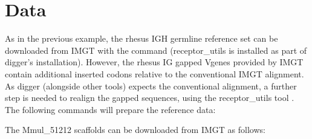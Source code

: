 \documentclass[letterpaper,10pt,english]{sphinxmanual}
\begin{document}
\section{Data}
\label{\detokenize{examples/rhesus_igh:data}}
\sphinxAtStartPar
As in the previous example, the rhesus IGH germline reference set can be downloaded from IMGT with the  command
 (receptor\_utils is installed as part of digger’s installation). However, the rhesus IG gapped V\sphinxhyphen{}genes provided by IMGT contain additional inserted codons relative to
the conventional IMGT alignment. As digger (alongside other tools) expects the conventional alignment, a further step is needed to realign the gapped sequences, using the receptor\_utils
tool . The following commands will prepare the reference data:

\begin{sphinxVerbatim}[commandchars=\\\{\}]
    
   \PYGZbs{}
     
     \PYGZbs{}
     
\end{sphinxVerbatim}

\sphinxAtStartPar
The Mmul\_51212 scaffolds can be downloaded from IMGT as follows:
\end{document}

